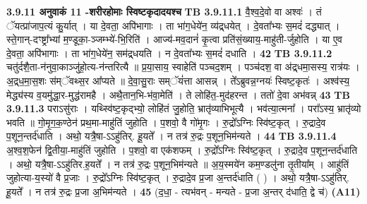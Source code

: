 \documentclass[17pt]{extarticle}
\begin{document}
{{{{{{{{{{{{{{{{{{{{{{                \textbf{ 3.9.11    अनुवाकं   11 -शरीरहोमाः स्विष्टकृदादयश्च} \newline
                                \textbf{ TB 3.9.11.1} \newline
                  वै॒श्व॒दे॒वो वा अश्वः॑ । तं ॅयत्प्रा॑जाप॒त्यं कु॒र्यात् । या दे॒वता॒ अपि॑भागाः । ता भा॑ग॒धेये॑न॒ व्य॑द्र्धयेत् । दे॒वता᳚भ्यः स॒मदं॑ दद्ध्यात् । स्ते॒गान्-दꣳष्ट्रा᳚भ्यां म॒ण्डूका॒-ञ्जम्भ्ये॑-भि॒रिति॑ । आज्य॑-मव॒दानं॑ कृ॒त्वा प्रति॑सं॒ख्याय॒-माहु॑ती-र्जुहोति । या ए॒व दे॒वता॒ अपि॑भागाः । ता भा॑ग॒धेये॑न॒ सम॑द्र्धयति । न दे॒वता᳚भ्यः स॒मदं॑ दधाति । \textbf{ 42} \newline
                  \newline
                                \textbf{ TB 3.9.11.2} \newline
                  चतु॑र्दशै॒ता-न॑नुवा॒काञ्जु॑हो॒त्य-न॑न्तरित्यै ॥ प्र॒या॒साय॒ स्वाहेति॑ पञ्चद॒शम् । पञ्च॑दश॒ वा अ॑द्र्धमा॒सस्य॒ रात्र॑यः । अ॒द्र्ध॒मा॒स॒शः स॑म्ॅवथ्स॒र आ᳚प्यते ॥ दे॒वा॒सु॒राः सम्ॅयं॑त्ता आसन्न् । ते᳚ऽब्रुवन्न॒ग्नयः॑ स्विष्ट॒कृतः॑ । अश्व॑स्य॒ मेद्ध्य॑स्य व॒यमु॑द्धा॒र-मुद्ध॑रामहै । अथै॒तान॒भि-भ॑वा॒मेति॑ । ते लोहि॑त॒-मुद॑हरन्त । ततो॑ दे॒वा अभ॑वन्न् \textbf{ 43} \newline
                  \newline
                                \textbf{ TB 3.9.11.3} \newline
                  पराऽसु॑राः । यथ्स्वि॑ष्ट॒कृद्भ्यो॒ लोहि॑तं जु॒होति॒ भ्रातृ॑व्याभिभूत्यै । भव॑त्या॒त्मना᳚ । परा᳚ऽस्य॒ भ्रातृ॑व्यो भवति ॥ गो॒मृ॒ग॒क॒ण्ठेन॑ प्रथ॒मा-माहु॑तिं जुहोति । प॒शवो॒ वै गो॑मृ॒गः । रु॒द्रो᳚ऽग्निः स्वि॑ष्ट॒कृत् । रु॒द्रादे॒व प॒शून॒न्तर्द॑धाति । अथो॒ यत्रै॒षा-ऽऽहु॑तिर्. हू॒यते᳚ । न तत्र॑ रु॒द्रः प॒शून॒भिम॑न्यते । \textbf{ 44} \newline
                  \newline
                                \textbf{ TB 3.9.11.4} \newline
                  अ॒श्व॒श॒फेन॑ द्वि॒तीया॒-माहु॑तिं जुहोति । प॒शवो॒ वा एक॑शफम् । रु॒द्रो᳚ऽग्निः स्वि॑ष्ट॒कृत् । रु॒द्रादे॒व प॒शून॒न्तर्द॑धाति । अथो॒ यत्रै॒षा-ऽऽहु॑तिर.ह॒यते᳚ । न तत्र॑ रु॒द्रः प॒शून॒भिम॑न्यते ॥ अ॒य॒स्मये॑न कम॒ण्डलु॑ना तृ॒तीया᳚म् । आहु॑तिं जुहोत्या-य॒स्यो॑ वै प्र॒जाः । रु॒द्रो᳚ऽग्निः स्वि॑ष्ट॒कृत् । रु॒द्रादे॒व प्र॒जा अ॒न्तर्द॑धाति ( ) । अथो॒ यत्रै॒षा-ऽऽहु॑तिर्. हू॒यते᳚ । न तत्र॑ रु॒द्रः प्र॒जा अ॒भिम॑न्यते । \textbf{ 45} \newline
                  \newline
                                    (द॒धा॒ - त्यभ॑वन् - मन्यते - प्र॒जा अ॒न्तर् द॑धाति॒ द्वे च॑) \textbf{(A11)} \newline \newline
}}}}}}}}}}}}}}}}}}}}}}
\end{document}
